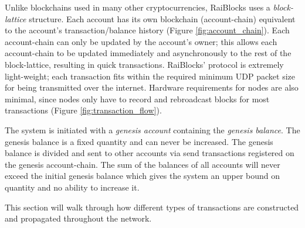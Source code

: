 Unlike blockchains used in many other cryptocurrencies, RaiBlocks uses a \textit{block-lattice} structure. Each account has its own blockchain (account-chain) equivalent to the account's transaction/balance history (Figure \ref{fig:account_chain}). Each account-chain can only be updated by the account's owner; this allows each account-chain to be updated immediately and asynchronously to the rest of the block-lattice, resulting in quick transactions. RaiBlocks' protocol is extremely light-weight; each transaction fits within the required minimum UDP packet size for being transmitted over the internet. Hardware requirements for nodes are also minimal, since nodes only have to record and rebroadcast blocks for most transactions (Figure \ref{fig:transaction_flow}).

The system is initiated with a \textit{genesis account} containing the \textit{genesis balance}. The genesis balance is a fixed quantity and can never be increased. The genesis balance is divided and sent to other accounts via send transactions registered on the genesis account-chain. The sum of the balances of all accounts will never exceed the initial genesis balance which gives the system an upper bound on quantity and no ability to increase it.

This section will walk through how different types of transactions are constructed and propagated throughout the network.

